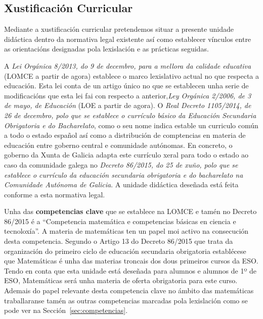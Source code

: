 \subsection{Xustificación Curricular}
Mediante a xustificación curricular pretendemos situar a presente unidade didáctica dentro da normativa legal existente así como establecer vínculos entre as orientacións designadas pola lexislación e as prácticas seguidas.

A \emph{Lei Orgánica 8/2013, do 9 de decembro, para a mellora da calidade educativa} (LOMCE a partir de agora) establece o marco lexislativo actual no que respecta a educación. Esta lei conta de un artigo único no que se establecen unha serie de modificacións que esta lei fai con respecto a anterior,\emph{Ley Orgánica 2/2006, de 3 de mayo, de Educación} (LOE a partir de agora). O \emph{Real Decreto 1105/2014, de 26 de decembro, polo que se establece o currículo básico da Educación Secundaria Obrigatoria e do Bacharelato}, como o seu nome indica estable un curriculo común a todo o estado español así como a distribución de comptencias en materia de educación entre goberno central e comunidade autónomas. En concreto, o goberno da Xunta de Galicia adapta este currículo xeral para todo o estado ao caso da comunidade galega no \emph{Decreto 86/2015, do 25 de xuño, polo que se establece o currículo da educación secundaria obrigatoria e do bacharelato na Comunidade Autónoma de Galicia}. A unidade didáctica deseñada está feita conforme a esta normativa legal.

Unha das \textbf{competencias clave} que se establece na LOMCE e tamén no Decreto 86/2015 é a ``Competencia matemática e competencias básicas en ciencia e tecnoloxía''. A materia de matemáticas ten un papel moi activo na consecución desta competencia. Segundo o Artigo 13 do Decreto 86/2015 que trata da organización do primeiro ciclo de educación secundaria obrigatoria establécese que Matemáticas é unha das materias troncais dos dous primeiros cursos da ESO. Tendo en conta que esta unidade está deseñada para alumnos e alumnos de 1º de ESO, Matemáticas será unha materia de oferta obrigatoria para este curso. Ademais do papel relevante desta competencia clave no ámbito das matemáticas traballaranse tamén as outras competencias marcadas pola lexislación como se pode ver na Sección~\ref{sec:competencias}.

